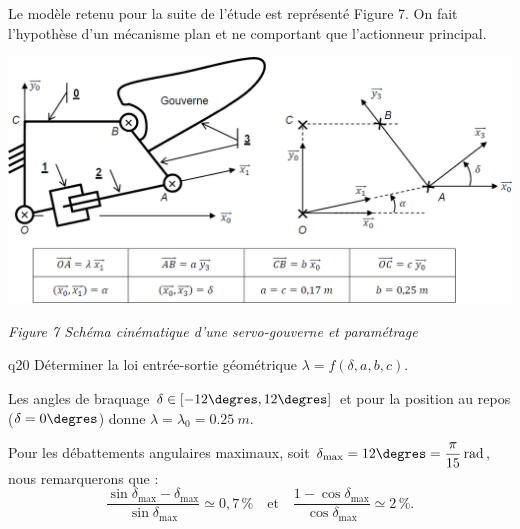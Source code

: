 \begin{multicols}{2}
Le modèle retenu pour la suite de l’étude est représenté Figure 7. On fait l’hypothèse d’un mécanisme plan
et ne comportant que l’actionneur principal.


\begin{center}
\includegraphics[width=\linewidth]{images/fig_08_a}

\textit{Figure 7 Schéma cinématique d'une servo-gouverne et paramétrage}
\end{center}


{\begin{question}{q20}
Déterminer la loi entrée-sortie géométrique $\lambda=f\left( \delta, a, b, c\right)$.
\ifprof
\begin{corrige}
\end{corrige}
\else
\fi
\begin{reponses}
\end{reponses} \end{question}}  

Les angles de braquage $\delta\in\left[-12\degres, 12\degres \right]$ et pour la position au repos ($\delta=0\degres$) donne $\lambda = \lambda_0 = \SI{0,25}{m}$.

Pour les débattements angulaires maximaux, soit $\delta_{\text{max}}=12\degres =\dfrac{\pi}{15}\, \text{rad}$, nous remarquerons que :  
$$
\dfrac{\sin\delta_{\text{max}}-\delta_{\text{max}}}{\sin\delta_{\text{max}}} \simeq 0,7\,\%
\quad
\text{et}
\quad
\dfrac{1-\cos\delta_{\text{max}}}{\cos\delta_{\text{max}}}\simeq 2\,\%.
$$




\end{multicols}
